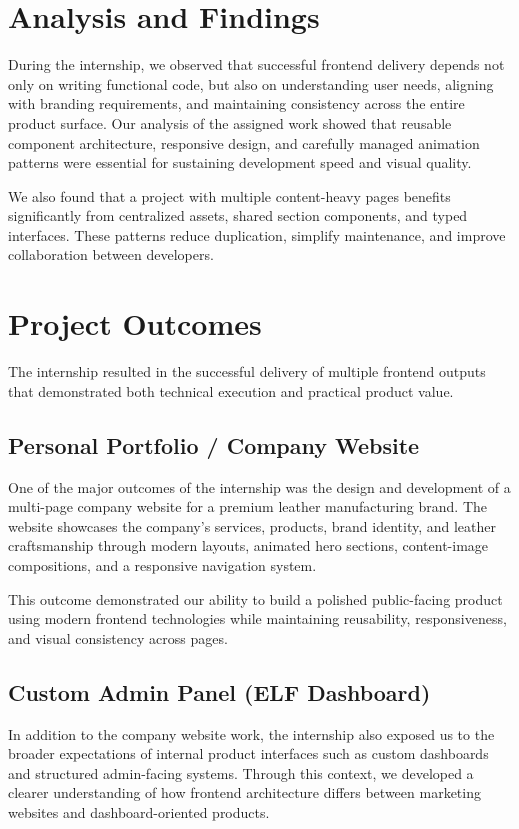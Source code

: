 \documentclass[12pt, oneside, a4paper]{book}
\begin{document}
\begin{doublespace}
\section{Analysis and Findings}

During the internship, we observed that successful frontend delivery depends not only on
writing functional code, but also on understanding user needs, aligning with branding
requirements, and maintaining consistency across the entire product surface. Our analysis
of the assigned work showed that reusable component architecture, responsive design, and
carefully managed animation patterns were essential for sustaining development speed and
visual quality.

We also found that a project with multiple content-heavy pages benefits significantly
from centralized assets, shared section components, and typed interfaces. These patterns
reduce duplication, simplify maintenance, and improve collaboration between developers.

\section{Project Outcomes}

The internship resulted in the successful delivery of multiple frontend outputs that
demonstrated both technical execution and practical product value.

\subsection{Personal Portfolio / Company Website}

One of the major outcomes of the internship was the design and development of a
multi-page company website for a premium leather manufacturing brand. The website
showcases the company's services, products, brand identity, and leather craftsmanship
through modern layouts, animated hero sections, content-image compositions, and a
responsive navigation system.

This outcome demonstrated our ability to build a polished public-facing product using
modern frontend technologies while maintaining reusability, responsiveness, and visual
consistency across pages.

\subsection{Custom Admin Panel (ELF Dashboard)}

In addition to the company website work, the internship also exposed us to the broader
expectations of internal product interfaces such as custom dashboards and structured
admin-facing systems. Through this context, we developed a clearer understanding of how
frontend architecture differs between marketing websites and dashboard-oriented products.


\end{doublespace}
\end{document}

